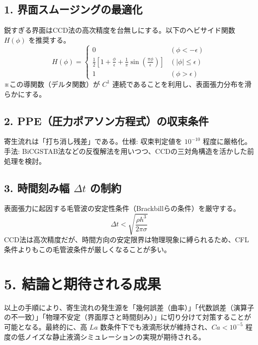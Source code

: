 \documentclass[12pt, a4paper, titlepage, xelatex, ja=standard, jafont=hiragino-pron, twoside]{bxjsarticle}
\begin{document}
\subsection*{1. 界面スムージングの最適化}
鋭すぎる界面はCCD法の高次精度を台無しにする。以下のヘビサイド関数 $H(\phi)$ を推奨する。
$$H(\phi) = \begin{cases}
0 & (\phi < -\epsilon) \\
\frac{1}{2} \left[1 + \frac{\phi}{\epsilon} + \frac{1}{\pi} \sin\left(\frac{\pi \phi}{\epsilon}\right)\right] & (|\phi| \le \epsilon) \\
1 & (\phi > \epsilon)
\end{cases}$$
※この導関数（デルタ関数）が $C^1$ 連続であることを利用し、表面張力分布を滑らかにする。

\subsection*{2. PPE（圧力ポアソン方程式）の収束条件}
寄生流れは「打ち消し残差」である。仕様: 収束判定値を $10^{-10}$ 程度に厳格化。手法: BiCGSTAB法などの反復解法を用いつつ、CCDの三対角構造を活かした前処理を検討。

\subsection*{3. 時間刻み幅 $\Delta t$ の制約}
表面張力に起因する毛管波の安定性条件（Brackbillらの条件）を厳守する。
$$\Delta t < \sqrt{\frac{\rho h^3}{2\pi\sigma}}$$
CCD法は高次精度だが、時間方向の安定限界は物理現象に縛られるため、CFL条件よりもこの毛管波条件が厳しくなることが多い。

\section*{5. 結論と期待される成果}
以上の手順により、寄生流れの発生源を「幾何誤差（曲率）」「代数誤差（演算子の不一致）」「物理不安定（界面厚さと時間刻み）」に切り分けて対策することが可能となる。最終的に、高 $La$ 数条件下でも液滴形状が維持され、$Ca < 10^{-5}$ 程度の低ノイズな静止液滴シミュレーションの実現が期待される。
\end{document}
